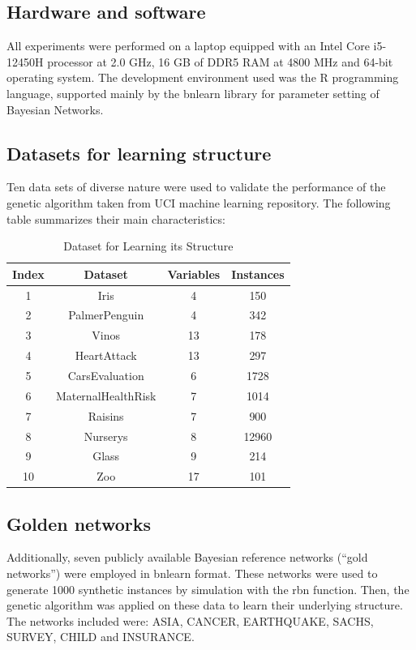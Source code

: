 \documentclass[runningheads]{llncs}
\begin{document}
\subsection{Hardware and software}

All experiments were performed on a laptop equipped with an Intel Core i5-12450H processor at 2.0 GHz, 16 GB of DDR5 RAM at 4800 MHz and 64-bit operating system. The development environment used was the R programming language, supported mainly by the bnlearn library for parameter setting of Bayesian Networks.

\subsection{Datasets for learning structure}

Ten data sets of diverse nature were used to validate the performance of the genetic algorithm taken from UCI machine learning repository. The following table summarizes their main characteristics:

\begin{table}[h!]
	\centering
	\caption{Dataset for Learning its Structure}
	\begin{tabular}{|c|c|c|c|}
		\hline
		\textbf{Index} & \textbf{Dataset} & \textbf{Variables} & \textbf{Instances} \\
		\hline
		1 & Iris & 4 & 150 \\
		\hline
		2 & PalmerPenguin & 4 & 342 \\
		\hline
		3 & Vinos & 13 & 178 \\
		\hline
		4 & HeartAttack & 13 & 297 \\
		\hline
		5 & CarsEvaluation & 6 & 1728 \\
		\hline
		6 & MaternalHealthRisk & 7 & 1014 \\
		\hline
		7 & Raisins & 7 & 900 \\
		\hline
		8 & Nurserys & 8 & 12960 \\
		\hline
		9 & Glass & 9 & 214 \\
		\hline
		10 & Zoo & 17 & 101 \\
		\hline
	\end{tabular}
\end{table}

\subsection{Golden networks}

Additionally, seven publicly available Bayesian reference networks (“gold networks”) were employed in bnlearn format. These networks were used to generate 1000 synthetic instances by simulation with the rbn function. Then, the genetic algorithm was applied on these data to learn their underlying structure. The networks included were: ASIA, CANCER, EARTHQUAKE, SACHS, SURVEY, CHILD and INSURANCE.
\end{document}
